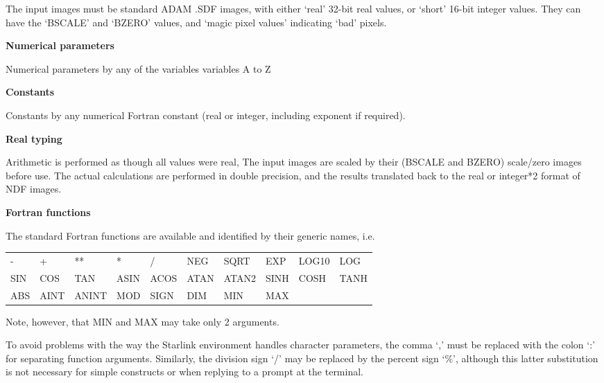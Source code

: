 \begin{small}
{{ The input images must be standard \starman ADAM .SDF images, with
  either `real' 32-bit real values, or `short' 16-bit integer values.
  They can have the `BSCALE' and `BZERO' values, and `magic pixel values'
  indicating `bad' pixels.
 
{\hspace*{4ex} \bf  Numerical parameters}
 
  Numerical parameters by any of the variables variables A to Z
 
{\hspace*{4ex} \bf  Constants}
 
  Constants by any numerical Fortran constant (real or integer,
  including exponent if required).
 
{\hspace*{4ex} \bf  Real typing}
 
  Arithmetic is performed as though all values were real, The
  input images are scaled by their (BSCALE and BZERO) scale/zero
  images before use. The actual calculations are performed in
  double precision, and the results translated back to the
  real or integer*2 format of \starman NDF images.
 
{\hspace*{4ex} \bf  Fortran functions}
 
   The standard Fortran functions are available and identified
    by their generic names, i.e.
 
\begin{tabular}{llllllllll}
        -     &    +      &   **     &   *     &  /     & NEG   &
        SQRT  &    EXP    &   LOG10  &   LOG   \\
        SIN   &    COS    &   TAN    &   ASIN  &  ACOS  & ATAN  &
        ATAN2 &    SINH   &   COSH   &   TANH  \\
        ABS   &    AINT   &   ANINT  &    MOD  &  SIGN  & DIM   &
        MIN   &    MAX    &          &        \\
\end{tabular}
 
    Note, however, that MIN and MAX may take only 2 arguments.
 
    To avoid problems with the way the Starlink environment
    handles character parameters, the comma `,' must be replaced with
    the colon `:' for separating function arguments. Similarly, the
    division sign `/' may be replaced by the percent sign `\%', although
    this latter substitution is not necessary for simple constructs or
    when replying to a prompt at the terminal.
 
}}
\end{small}
